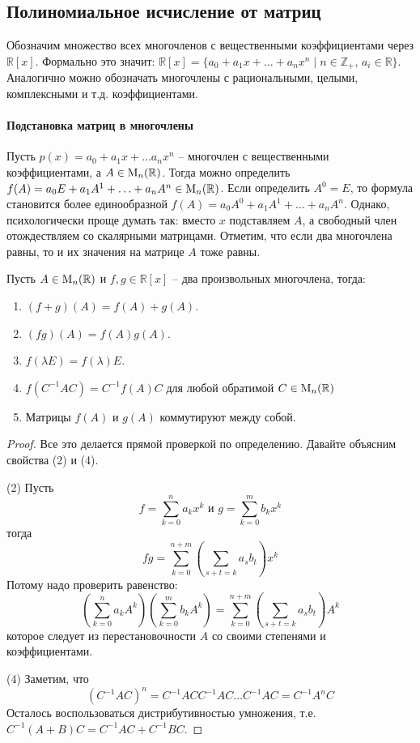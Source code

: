 \subsection{Полиномиальное исчисление от матриц}

Обозначим множество всех многочленов с вещественными коэффициентами через $\mathbb R[x]$.
Формально это значит: $\mathbb R[x]=\{a_0+a_1x + \ldots + a_n x^n\mid n\in \mathbb Z_{+},\, a_i\in \mathbb R\}$.
Аналогично можно обозначать многочлены с рациональными, целыми, комплексными и т.д. коэффициентами.

\paragraph{Подстановка матриц в многочлены}

Пусть $p(x) = a_0+a_1x+\ldots a_n x^n$ -- многочлен с вещественными коэффициентами, а $A\in\operatorname{M}_{n}(\mathbb R)$.
Тогда можно определить $f(A)= a_0 E + a_1 A^1 + \ldots + a_n A^n\in\operatorname{M}_{n}(\mathbb R)$.
Если определить $A^0 = E$, то формула становится более единообразной $f(A)= a_0 A^0 + a_1 A^1 + \ldots + a_n A^n$.
Однако, психологически проще думать так: вместо $x$ подставляем $A$, а свободный член отождествляем со скалярными матрицами.
Отметим, что если два многочлена равны, то и их значения на матрице $A$ тоже равны.

\begin{claim*}
Пусть $A\in\operatorname{M}_{n}(\mathbb R)$ и $f,g\in\mathbb R[x]$ -- два произвольных многочлена, тогда:
\begin{enumerate}
\item $(f+g)(A) = f(A) + g(A)$.

\item $(fg)(A) = f(A)g(A)$.

\item $f(\lambda E) = f(\lambda)E$.

\item $f(C^{-1}AC) = C^{-1}f(A)C$ для любой обратимой $C\in \operatorname{M}_{n}(\mathbb R)$

\item Матрицы $f(A)$ и $g(A)$ коммутируют между собой.
\end{enumerate}
\end{claim*}
\begin{proof}
Все это делается прямой проверкой по определению.
Давайте объясним свойства (2) и (4).

(2) Пусть 
\[
f = \sum_{k=0}^na_k x^k\text{ и }g = \sum_{k=0}^m b_k x^k
\]
тогда 
\[
fg = \sum_{k=0}^{n + m} \left(\sum_{s + t = k }a_s b_t\right) x^k
\]
Потому надо проверить равенство:
\[
\left(\sum_{k=0}^n a_k A^k\right)\left(\sum_{k=0}^mb_k A^k\right) = \sum_{k=0}^{n+m}\left(\sum_{s+t = k} a_s b_t\right)A^k
\]
которое следует из перестановочности $A$ со своими степенями и коэффициентами.

(4) Заметим, что
\[
(C^{-1}AC)^n = C^{-1}ACC^{-1}AC\ldots C^{-1}AC = C^{-1}A^nC
\]
Осталось воспользоваться дистрибутивностью умножения, т.е. $C^{-1}(A + B)C = C^{-1}AC + C^{-1}BC$.
\end{proof}

